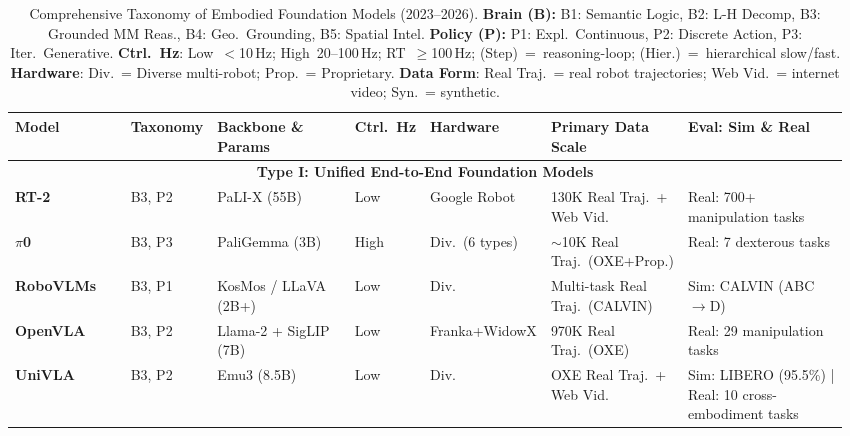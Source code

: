 \documentclass[acmsmall,screen,review,anonymous]{acmart}
\begin{document}
\begin{table}[t!]
\centering
\caption{Comprehensive Taxonomy of Embodied Foundation Models (2023--2026).
\textbf{Brain (B):} B1: Semantic Logic, B2: L-H Decomp, B3: Grounded MM Reas., B4: Geo.\ Grounding, B5: Spatial Intel.
\textbf{Policy (P):} P1: Expl.\ Continuous, P2: Discrete Action, P3: Iter.\ Generative.
\textbf{Ctrl.~Hz}: Low~$<$10\,Hz; High~20--100\,Hz; RT~$\geq$100\,Hz; (Step)~=~reasoning-loop; (Hier.)~=~hierarchical slow/fast.
\textbf{Hardware}: Div.\ = Diverse multi-robot; Prop.\ = Proprietary.
\textbf{Data Form}: Real Traj.\ = real robot trajectories; Web Vid.\ = internet video; Syn.\ = synthetic.}\label{tab:embodied_models_2026_v4}
\renewcommand{\arraystretch}{1.2}
\setlength{\tabcolsep}{3pt}
\scriptsize

\begin{tabular}{
  p{0.14\linewidth}
  p{0.08\linewidth}
  p{0.17\linewidth}
  p{0.08\linewidth}
  p{0.13\linewidth}
  p{0.168\linewidth}
  p{0.205\linewidth}
}
\toprule
\textbf{Model} &
\textbf{Taxonomy} &
\textbf{Backbone \& Params} &
\textbf{Ctrl.\ Hz} &
\textbf{Hardware} &
\textbf{Primary Data Scale} &
\textbf{Eval: Sim \& Real} \\
\midrule

\multicolumn{7}{c}{\textbf{Type I\@: Unified End-to-End Foundation Models}} \\
\midrule

\textbf{RT-2}~\cite{brohan2023rt2} & B3, P2 & PaLI-X (55B) & Low & Google Robot & 130K Real Traj.\ + Web Vid. & Real: 700+ manipulation tasks \\

\textbf{$\pi$0}~\cite{black2024pi0} & B3, P3 & PaliGemma (3B) & High & Div.\ (6 types) & $\sim$10K Real Traj.\ (OXE+Prop.) & Real: 7 dexterous tasks \\

\textbf{RoboVLMs}~\cite{li2026matters} & B3, P1 & KosMos / LLaVA (2B+) & Low & Div. & Multi-task Real Traj.\ (CALVIN) & Sim: CALVIN (ABC$\rightarrow$D) \\

\textbf{OpenVLA}~\cite{kim2024openvla} & B3, P2 & Llama-2 + SigLIP (7B) & Low & Franka+WidowX & 970K Real Traj.\ (OXE) & Real: 29 manipulation tasks \\

\textbf{UniVLA}~\cite{bu2025univla} & B3, P2 & Emu3 (8.5B) & Low & Div. & OXE Real Traj.\ + Web Vid. & Sim: LIBERO (95.5\%) | Real: 10 cross-embodiment tasks \\


\end{tabular}
\end{table}
\end{document}
